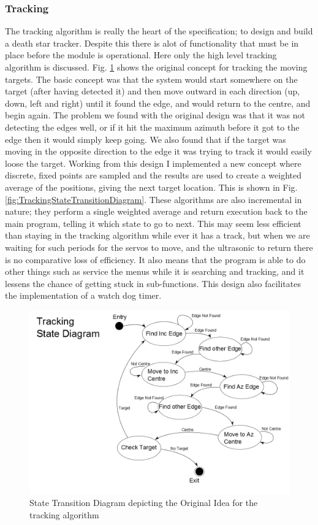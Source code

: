 \documentclass[]{report}
\begin{document}
\subsubsection{Tracking}
The tracking algorithm is really the heart of the specification; to design and build a death star tracker. Despite this there is alot of functionality that must be in place before the module is operational. Here only the high level tracking algorithm is discussed. \newline
Fig. \ref{fig:TrackingStateDiagram} shows the original concept for tracking the moving targets. The basic concept was that the system would start somewhere on the target (after having detected it) and then move outward in each direction (up, down, left and right) until it found the edge, and would return to the centre, and begin again. The problem we found with the original design was that it was not detecting the edges well, or if it hit the maximum azimuth before it got to the edge then it would simply keep going. We also found that if the target was moving in the opposite direction to the edge it was trying to track it would easily loose the target. \newline
Working from this design I implemented a new concept where discrete, fixed points are sampled and the results are used to create a weighted average of the positions, giving the next target location. This is shown in Fig. \ref{fig:TrackingStateTransitionDiagram}. \newline
These algorithms are also incremental in nature; they perform a single weighted average and return execution back to the main program, telling it which state to go to next. This may seem less efficient than staying in the tracking algorithm while ever it has a track, but when we are waiting for such periods for the servos to move, and the ultrasonic to return there is no comparative loss of efficiency. It also means that the program is able to do other things such as service the menus while it is searching and tracking, and it lessens the chance of getting stuck in sub-functions. This design also facilitates the implementation of a watch dog timer.

\begin{figure}
\centering
\includegraphics[width=0.7\linewidth]{"../Diagrams/Tracking State Diagram"}
\caption{State Transition Diagram depicting the Original Idea for the tracking algorithm}
\label{fig:TrackingStateDiagram}
\end{figure}
\end{document}

